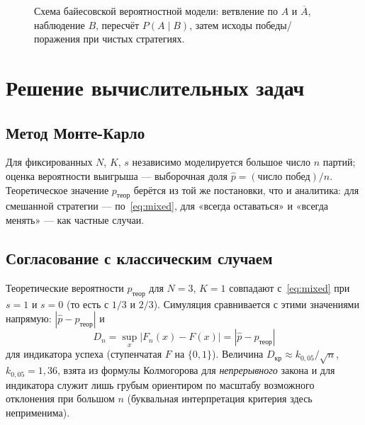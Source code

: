 \documentclass[a4paper, 14pt]{extarticle}
\begin{document}
\begin{figure}[H]
\caption{Схема байесовской вероятностной модели: ветвление по $A$ и $\overline{A}$, наблюдение $B$, пересчёт $P(A\mid B)$, затем исходы победы/поражения при чистых стратегиях.}
\label{fig:bayes_prob_tree}
\end{figure}

\section{Решение вычислительных задач}

\subsection{Метод Монте-Карло}
Для фиксированных $N$, $K$, $s$ независимо моделируется большое число $n$ партий; оценка вероятности выигрыша --- выборочная доля $\hat p = (\text{число побед})/n$. Теоретическое значение $p_{\text{теор}}$ берётся из той же постановки, что и аналитика: для смешанной стратегии --- по~\eqref{eq:mixed}, для «всегда оставаться» и «всегда менять» --- как частные случаи.

\subsection{Согласование с классическим случаем}
Теоретические вероятности $p_{\text{теор}}$ для $N=3$, $K=1$ совпадают с~\eqref{eq:mixed} при $s=1$ и $s=0$ (то есть с $1/3$ и $2/3$). Симуляция сравнивается с этими значениями напрямую: $| \hat p - p_{\text{теор}} |$ и
\[
D_n = \sup_x |F_n(x) - F(x)| = |\hat p - p_{\text{теор}}|
\]
для индикатора успеха (ступенчатая $F$ на $\{0,1\}$). Величина $D_{\text{кр}} \approx k_{0{,}05}/\sqrt{n}$, $k_{0{,}05}=1{,}36$, взята из формулы Колмогорова для \emph{непрерывного} закона и для индикатора служит лишь грубым ориентиром по масштабу возможного отклонения при большом $n$ (буквальная интерпретация критерия здесь неприменима).
\end{document}
